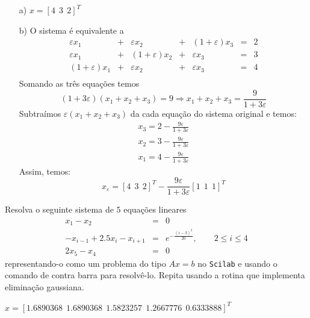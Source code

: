 \begin{resp}

\begin{itemize}
\item[a)] $x=[4 ~~3 ~~2]^T$

\item[b)] O sistema é equivalente a
$$
\begin{array}{lclclcl}
\varepsilon x_1 &+& \varepsilon x_2 &+&(1+\varepsilon) x_3 &=& 2\\
\varepsilon x_1 &+& (1+\varepsilon) x_2 &+&\varepsilon x_3 &=& 3\\
(1+\varepsilon) x_1 &+& \varepsilon x_2 &+&\varepsilon x_3 &=& 4\\
\end{array}
$$
Somando as três equações temos
$$(1+3\varepsilon)(x_1+x_2+x_3)=9\Longrightarrow x_1+x_2+x_3=\frac{9}{1+3\varepsilon}$$
Subtraímos $\varepsilon(x_1+x_2+x_3)$ da cada equação do sistema original e temos:
$$\begin{array}{l}
x_3=2-\frac{9\varepsilon}{1+3\varepsilon}\\
x_2=3-\frac{9\varepsilon}{1+3\varepsilon}\\
x_1=4-\frac{9\varepsilon}{1+3\varepsilon}
\end{array}
$$
Assim, temos:
$$x_{\varepsilon}=\left[4 ~~3 ~~2\right]^T-\frac{9\varepsilon}{1+3\varepsilon}\left[1 ~~1 ~~1\right]^T$$
\end{itemize}

\end{resp}
\fi

\ifisscilab
\begin{exer}\label{exer:trid} Resolva o seguinte sistema de $5$ equações lineares
\begin{eqnarray*}
x_1-x_2&=&0\\
-x_{i-1}+2.5x_i-x_{i+1}&=&e^{-\frac{(i-3)^2}{20}},\qquad 2\leq i \leq 4\\
2x_{5}-x_{4}&=&0
\end{eqnarray*}
representando-o como um problema do tipo $Ax=b$ no \verb+Scilab+ e usando o comando de contra barra para resolvê-lo. Repita usando a rotina que implementa eliminação gaussiana.
\end{exer}
\begin{resp}
 $x=[ 1.6890368  ~~  1.6890368  ~~  1.5823257  ~~  1.2667776   ~~ 0.6333888]^{T}$
\end{resp}
\fi

